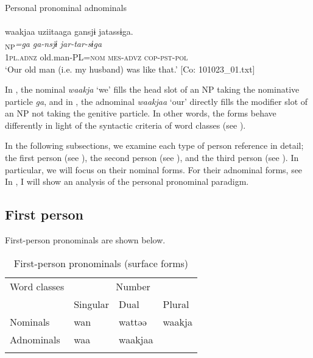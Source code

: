  \ex \label{ex:5:1b} Personal pronominal adnominals\\\\
\glll  waakjaa  uziitaaga  gansjɨ  jatassɨga.\\
[\textit{waakjaa}\textsubscript{Modifier}  \textit{uzii-taa}\textsubscript{Head}]\textsubscript{NP}\textit{=ga}  \textit{ga-nsjɨ}  \textit{jar-tar-sɨga}\\
1\textsc{pl}.\textsc{adnz}  old.man-PL=\textsc{nom}  \textsc{mes}-\textsc{advz}  \textsc{cop}-\textsc{pst}-\textsc{pol}\\
\glt ‘Our old man (i.e. my husband) was like that.’ [Co: 101023\_01.txt]
\z
\z

\noindent In , the nominal \textit{waakja} ‘we’ fills the head slot of an NP taking the nominative particle \textit{ga}, and in , the adnominal \textit{waakjaa} ‘our’ directly fills the modifier slot of an NP not taking the genitive particle. In other words, the forms behave differently in light of the syntactic criteria of word classes (see ).

  In the following subsections, we examine each type of person reference in detail; the first person (see ), the second person (see ), and the third person (see ). In particular, we will focus on their nominal forms. For their adnominal forms, see  In , I will show an analysis of the personal pronominal paradigm.

\subsection{First person} \label{sec:5.1.1}

First-person pronominals are shown below.

\begin{table}
\caption{\label{tab:key:33}First-person pronominals (surface forms)}
\begin{tabular}{llll}
\lsptoprule
Word classes  & \multicolumn{3}{c}{Number}\\\cmidrule(lr){2-4}
              &  Singular & Dual & Plural\\\midrule
Nominals & wan & wattəə & waakja\\
Adnominals & waa & waakjaa\\
\lspbottomrule
\end{tabular}
\end{table}

